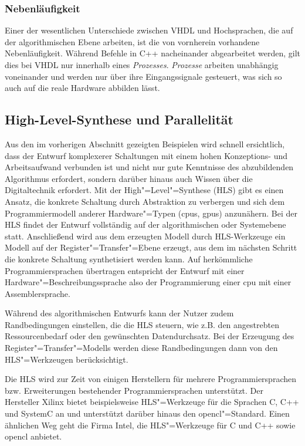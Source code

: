 \subsubsection{Nebenläufigkeit}

Einer der wesentlichen Unterschiede zwischen VHDL und Hochsprachen, die auf
der algorithmischen Ebene arbeiten, ist die von vornherein vorhandene
Nebenläufigkeit. Während Befehle in C++ nacheinander abgearbeitet werden, gilt
dies bei VHDL nur innerhalb eines \textit{Prozesses}. \textit{Prozesse} arbeiten
unabhängig voneinander und werden nur über ihre Eingangssignale gesteuert, was
sich so auch auf die reale Hardware abbilden lässt. \cite[vgl.][25]{kesel2013}

\subsection{High-Level-Synthese und Parallelität}\label{fpga:entwicklung:hls}

Aus den im vorherigen Abschnitt gezeigten Beispielen wird schnell ersichtlich,
dass der Entwurf komplexerer Schaltungen mit einem hohen Konzeptions- und
Arbeitsaufwand verbunden ist und nicht nur gute Kenntnisse des  abzubildenden
Algorithmus erfordert, sondern darüber hinaus auch Wissen über die Digitaltechnik
erfordert. Mit der High"=Level"=Synthese (HLS) gibt es einen Ansatz, die
konkrete Schaltung durch Abstraktion zu verbergen und sich dem Programmiermodell
anderer Hardware"=Typen (\gls{cpu}s, \gls{gpu}s) anzunähern. Bei der HLS findet
der Entwurf vollständig auf der algorithmischen oder Systemebene statt.
Anschließend wird aus dem erzeugten Modell durch HLS-Werkzeuge ein Modell auf
der Register"=Transfer"=Ebene erzeugt, aus dem im nächsten Schritt die konkrete
Schaltung synthetisiert werden kann. Auf herkömmliche Programmiersprachen
übertragen entspricht der Entwurf mit einer Hardware"=Beschreibungssprache also
der Programmierung einer \gls{cpu} mit einer Assemblersprache.
\cite[vgl.][7]{hlsintro2019}

Während des algorithmischen Entwurfs kann der Nutzer zudem Randbedingungen
einstellen, die die HLS steuern, wie z.B. den angestrebten Ressourcenbedarf oder
den gewünschten Datendurchsatz. Bei der Erzeugung des
Register"=Transfer"=Modells werden diese Randbedingungen dann von den
HLS"=Werkzeugen berücksichtigt. \cite[vgl.][482]{kesel2013}

Die HLS wird zur Zeit von einigen Herstellern für mehrere Programmiersprachen
bzw. Erweiterungen bestehender Programmiersprachen unterstützt. Der Hersteller
Xilinx bietet beispielsweise HLS"=Werkzeuge für die Sprachen C, C++ und SystemC
an und unterstützt darüber hinaus den \gls{opencl}"=Standard. Einen ähnlichen
Weg geht die Firma Intel, die HLS"=Werkzeuge für C und C++ sowie \gls{opencl}
anbietet.


